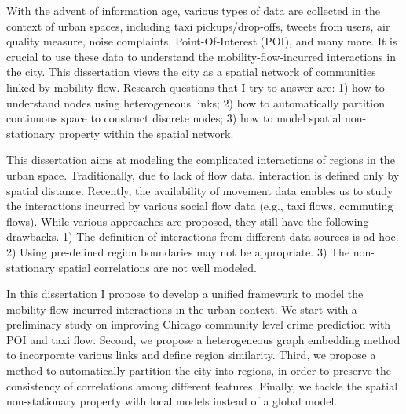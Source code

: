 With the advent of information age, various types of data are collected in the context of urban spaces, including taxi pickups/drop-offs, tweets from users, air quality measure, noise complaints, Point-Of-Interest (POI), and many more. It is crucial to use these data to understand the mobility-flow-incurred interactions in the city. This dissertation views the city as a spatial network of communities linked by mobility flow. Research questions that I try to answer are: 1) how to understand nodes using heterogeneous links; 2) how to automatically partition continuous space to construct discrete nodes; 3) how to model spatial non-stationary property within the spatial network.

This dissertation aims at modeling the complicated interactions of regions in the urban space. Traditionally, due to lack of flow data, interaction is defined only by spatial distance. Recently, the availability of movement data enables us to study the interactions incurred by various social flow data (e.g., taxi flows, commuting flows).  While various approaches are proposed, they still have the following drawbacks. 1) The definition of interactions from different data sources is ad-hoc. 2) Using pre-defined region boundaries may not be appropriate. 3) The non-stationary spatial correlations are not well modeled.
 
In this dissertation I propose to develop a unified framework to model the mobility-flow-incurred interactions in the urban context. We start with a preliminary study on improving Chicago community level crime prediction with POI and taxi flow. Second, we propose a heterogeneous graph embedding method to incorporate various links and define region similarity. Third, we propose a method to automatically partition the city into regions, in order to preserve the consistency of correlations among different features. Finally, we tackle the spatial non-stationary property with local models instead of a global model. 





